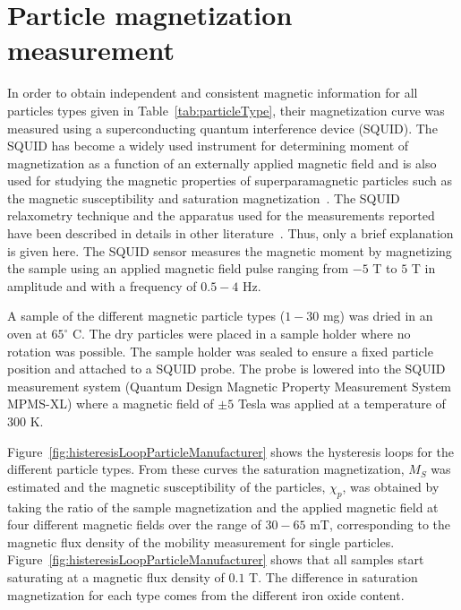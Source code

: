 \section{Particle magnetization measurement}
In order to obtain independent and consistent magnetic information for all particles types given in Table~\ref{tab:particleType}, their magnetization curve was measured using a superconducting quantum interference device (SQUID). The SQUID has become a widely used instrument for determining moment of magnetization as a function of an externally applied magnetic field and is also used for studying the magnetic properties of superparamagnetic particles such as the magnetic susceptibility and saturation magnetization~\cite{Cullity2011}. The SQUID relaxometry technique and the apparatus used for the measurements reported have been described in details in other literature~\cite{Cullity2011,Flynn2005,Adolphi2009}. Thus, only a brief explanation is given here. The SQUID sensor measures the magnetic moment by magnetizing the sample using an applied magnetic field pulse ranging from $-5$ T to $5$ T in amplitude and with a frequency of $0.5-4$ Hz.

A sample of the different magnetic particle types ($1-30$ mg) was dried in an oven at $65^\circ$ C. The dry particles were placed in a sample holder where no rotation was possible. The sample holder was sealed to ensure a fixed particle position and attached to a SQUID probe. The probe is lowered into the SQUID measurement system (Quantum Design Magnetic Property Measurement System MPMS-XL) where a magnetic field of $\pm5$ Tesla was applied at a temperature of $300$ K. 

Figure~\ref{fig:histeresisLoopParticleManufacturer} shows the hysteresis loops for the different particle types. From these curves the saturation magnetization, $M_{S}$ was estimated and the magnetic susceptibility of the particles, $\chi_{p}$, was obtained by taking the ratio of the sample magnetization and the applied magnetic field at four different magnetic fields over the range of $30-65$ mT, corresponding to the magnetic flux density of the mobility measurement for single particles. Figure~\ref{fig:histeresisLoopParticleManufacturer} shows that all samples start saturating at a magnetic flux density of $0.1$ T. The difference in saturation magnetization for each type comes from the different iron oxide content.
 

